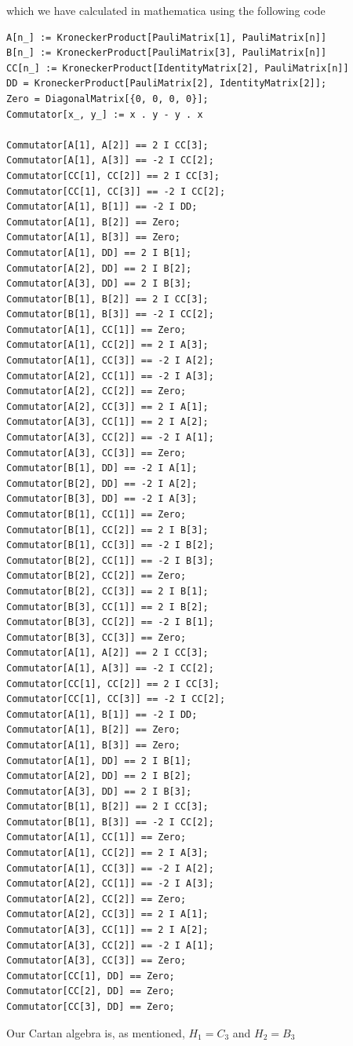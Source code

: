 \documentclass[a4paper,12pt]{article}
\begin{document}
which we have calculated in mathematica using the following code
\begin{lstlisting}
A[n_] := KroneckerProduct[PauliMatrix[1], PauliMatrix[n]]
B[n_] := KroneckerProduct[PauliMatrix[3], PauliMatrix[n]]
CC[n_] := KroneckerProduct[IdentityMatrix[2], PauliMatrix[n]]
DD = KroneckerProduct[PauliMatrix[2], IdentityMatrix[2]];
Zero = DiagonalMatrix[{0, 0, 0, 0}];
Commutator[x_, y_] := x . y - y . x

Commutator[A[1], A[2]] == 2 I CC[3];
Commutator[A[1], A[3]] == -2 I CC[2];
Commutator[CC[1], CC[2]] == 2 I CC[3];
Commutator[CC[1], CC[3]] == -2 I CC[2];
Commutator[A[1], B[1]] == -2 I DD;
Commutator[A[1], B[2]] == Zero;
Commutator[A[1], B[3]] == Zero;
Commutator[A[1], DD] == 2 I B[1];
Commutator[A[2], DD] == 2 I B[2];
Commutator[A[3], DD] == 2 I B[3];
Commutator[B[1], B[2]] == 2 I CC[3];
Commutator[B[1], B[3]] == -2 I CC[2];
Commutator[A[1], CC[1]] == Zero;
Commutator[A[1], CC[2]] == 2 I A[3];
Commutator[A[1], CC[3]] == -2 I A[2];
Commutator[A[2], CC[1]] == -2 I A[3];
Commutator[A[2], CC[2]] == Zero;
Commutator[A[2], CC[3]] == 2 I A[1];
Commutator[A[3], CC[1]] == 2 I A[2];
Commutator[A[3], CC[2]] == -2 I A[1];
Commutator[A[3], CC[3]] == Zero;
Commutator[B[1], DD] == -2 I A[1];
Commutator[B[2], DD] == -2 I A[2];
Commutator[B[3], DD] == -2 I A[3];
Commutator[B[1], CC[1]] == Zero;
Commutator[B[1], CC[2]] == 2 I B[3];
Commutator[B[1], CC[3]] == -2 I B[2];
Commutator[B[2], CC[1]] == -2 I B[3];
Commutator[B[2], CC[2]] == Zero;
Commutator[B[2], CC[3]] == 2 I B[1];
Commutator[B[3], CC[1]] == 2 I B[2];
Commutator[B[3], CC[2]] == -2 I B[1];
Commutator[B[3], CC[3]] == Zero;
Commutator[A[1], A[2]] == 2 I CC[3];
Commutator[A[1], A[3]] == -2 I CC[2];
Commutator[CC[1], CC[2]] == 2 I CC[3];
Commutator[CC[1], CC[3]] == -2 I CC[2];
Commutator[A[1], B[1]] == -2 I DD;
Commutator[A[1], B[2]] == Zero;
Commutator[A[1], B[3]] == Zero;
Commutator[A[1], DD] == 2 I B[1];
Commutator[A[2], DD] == 2 I B[2];
Commutator[A[3], DD] == 2 I B[3];
Commutator[B[1], B[2]] == 2 I CC[3];
Commutator[B[1], B[3]] == -2 I CC[2];
Commutator[A[1], CC[1]] == Zero;
Commutator[A[1], CC[2]] == 2 I A[3];
Commutator[A[1], CC[3]] == -2 I A[2];
Commutator[A[2], CC[1]] == -2 I A[3];
Commutator[A[2], CC[2]] == Zero;
Commutator[A[2], CC[3]] == 2 I A[1];
Commutator[A[3], CC[1]] == 2 I A[2];
Commutator[A[3], CC[2]] == -2 I A[1];
Commutator[A[3], CC[3]] == Zero;
Commutator[CC[1], DD] == Zero;
Commutator[CC[2], DD] == Zero;
Commutator[CC[3], DD] == Zero;
\end{lstlisting}
Our Cartan algebra is, as mentioned, $H_1=C_3$ and $H_2=B_3$
\end{document}
